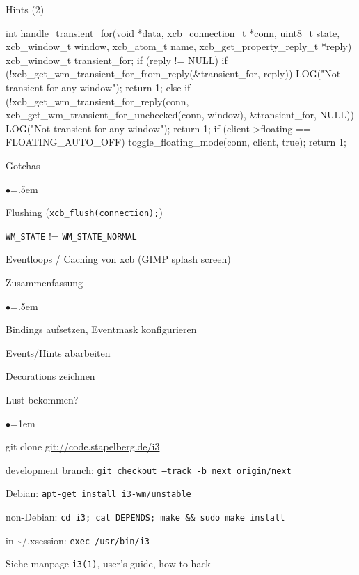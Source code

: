 \documentclass[mode=print,paper=screen,style=jefka]{powerdot}
\begin{document}
\begin{slide}[method=direct]{Hints (2)}
\begin{code}
int handle_transient_for(void *data, xcb_connection_t *conn,
           uint8_t state, xcb_window_t window,
           xcb_atom_t name, xcb_get_property_reply_t *reply)
{
  xcb_window_t transient_for;
  if (reply != NULL) {
    if (!xcb_get_wm_transient_for_from_reply(&transient_for, reply)) {
      LOG("Not transient for any window\n");
      return 1;
    }
  } else {
    if (!xcb_get_wm_transient_for_reply(conn,
        xcb_get_wm_transient_for_unchecked(conn, window),
        &transient_for, NULL)) {
      LOG("Not transient for any window\n");
      return 1;
    }
  }
  if (client->floating == FLOATING_AUTO_OFF)
    toggle_floating_mode(conn, client, true);
  return 1;
}
\end{code}
\end{slide}

\begin{slide}[method=direct]{Gotchas}
\begin{list}{$\bullet$}{\itemsep=.5em}
	\item Flushing (\texttt{xcb\_flush(connection);})
	\item \texttt{WM\_STATE} != \texttt{WM\_STATE\_NORMAL}
	\item Eventloops / Caching von xcb (GIMP splash screen)
\end{list}
\end{slide}


\begin{slide}{Zusammenfassung}
\begin{list}{$\bullet$}{\itemsep=.5em}
	\item Bindings aufsetzen, Eventmask konfigurieren
	\item Events/Hints abarbeiten
	\item Decorations zeichnen
\end{list}
\end{slide}

\begin{slide}{Lust bekommen?}
\begin{list}{$\bullet$}{\itemsep=1em}
	\item git clone \url{git://code.stapelberg.de/i3}
	\item development branch: \texttt{git checkout --track -b next origin/next}
	\item Debian: \texttt{apt-get install i3-wm/unstable}
	\item non-Debian: \texttt{cd i3; cat DEPENDS; make \&\& sudo make install}
	\item in \~{}/.xsession: \texttt{exec /usr/bin/i3}
	\item Siehe manpage \texttt{i3(1)}, user’s guide, how to hack
\end{list}
\end{slide}
\end{document}
